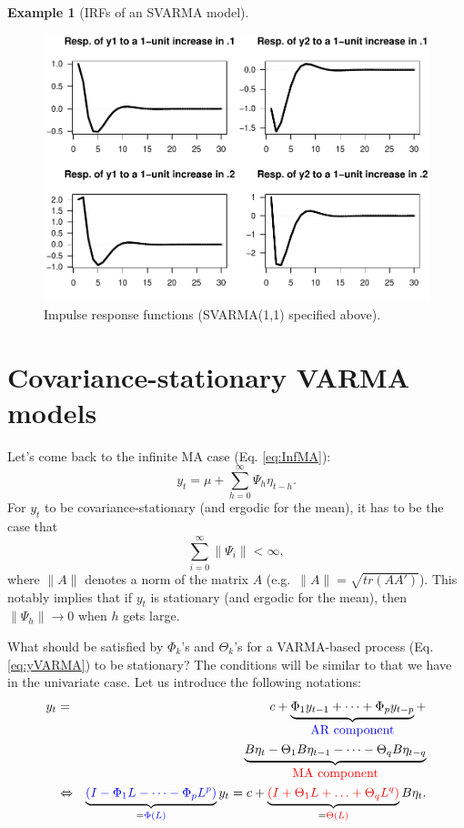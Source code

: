 \documentclass[
  12pt,
]{book}
\theoremstyle{definition}
\theoremstyle{definition}
\newtheorem{example}{Example}[chapter]
\theoremstyle{definition}
\theoremstyle{definition}
\theoremstyle{remark}
\begin{document}
\begin{example}[IRFs of an SVARMA model]
\begin{figure}
\includegraphics[width=0.95\linewidth]{IdentifStructShocks_files/figure-latex/simVAR-1} \caption{Impulse response functions (SVARMA(1,1) specified above).}\label{fig:simVAR}
\end{figure}

\end{example}

\section{Covariance-stationary VARMA models}\label{covariance-stationary-varma-models}

Let's come back to the infinite MA case (Eq. \eqref{eq:InfMA}):
\[
y_t = \mu + \sum_{h=0}^\infty \Psi_{h} \eta_{t-h}.
\]
For \(y_t\) to be covariance-stationary (and ergodic for the mean), it has to be the case that
\begin{equation}
\sum_{i=0}^\infty \|\Psi_i\| < \infty,
\label{eq:condiInfiniteMA}
\end{equation}
where \(\|A\|\) denotes a norm of the matrix \(A\) (e.g.~\(\|A\|=\sqrt{tr(AA')}\)). This notably implies that if \(y_t\) is stationary (and ergodic for the mean), then \(\|\Psi_h\|\rightarrow 0\) when \(h\) gets large.

What should be satisfied by \(\Phi_k\)'s and \(\Theta_k\)'s for a VARMA-based process (Eq. \eqref{eq:yVARMA}) to be stationary? The conditions will be similar to that we have in the univariate case. Let us introduce the following notations:
\begin{eqnarray}
y_t &=& c + \underbrace{\Phi_1 y_{t-1} + \dots +\Phi_p y_{t-p}}_{\color{blue}{\mbox{AR component}}} +  \\
&&\underbrace{B \eta_t - \Theta_1 B \eta_{t-1} - \dots - \Theta_q B \eta_{t-q}}_{\color{red}{\mbox{MA component}}} \nonumber\\
&\Leftrightarrow& \underbrace{ \color{blue}{(I - \Phi_1 L - \dots - \Phi_p L^p)}}_{= \color{blue}{\Phi(L)}}y_t = c +  \underbrace{ \color{red}{(I + \Theta_1 L + \ldots + \Theta_q L^q)}}_{=\color{red}{\Theta(L)}} B \eta_{t}. \nonumber
\label{eq:VARMA2}
\end{eqnarray}
\end{document}
